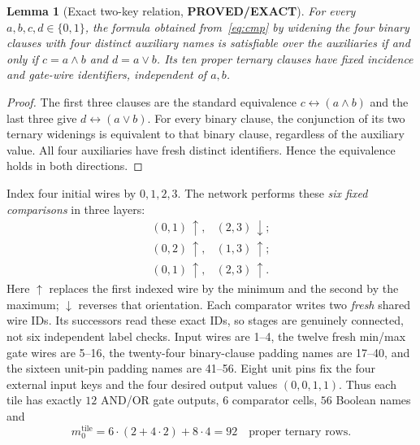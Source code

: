 \documentclass[11pt]{article}
\newtheorem{lemma}[theorem]{Lemma}
\begin{document}
\begin{lemma}[Exact two-key relation, \textbf{PROVED/EXACT}]
For every $a,b,c,d\in\{0,1\}$, the formula obtained from~\eqref{eq:cmp} by widening the four binary clauses with four distinct auxiliary names is satisfiable over the auxiliaries if and only if $c=a\wedge b$ and $d=a\vee b$. Its ten proper ternary clauses have fixed incidence and gate-wire identifiers, independent of $a,b$.
\end{lemma}
\begin{proof}
The first three clauses are the standard equivalence $c\leftrightarrow(a\wedge b)$ and the last three give $d\leftrightarrow(a\vee b)$. For every binary clause, the conjunction of its two ternary widenings is equivalent to that binary clause, regardless of the auxiliary value. All four auxiliaries have fresh distinct identifiers. Hence the equivalence holds in both directions.
\end{proof}

Index four initial wires by $0,1,2,3$. The network performs these \emph{six fixed comparisons} in three layers:
\[
\begin{array}{lll}
(0,1)\,\uparrow,&(2,3)\,\downarrow;\\
(0,2)\,\uparrow,&(1,3)\,\uparrow;\\
(0,1)\,\uparrow,&(2,3)\,\uparrow.
\end{array}
\]
Here $\uparrow$ replaces the first indexed wire by the minimum and the second by the maximum; $\downarrow$ reverses that orientation. Each comparator writes two \emph{fresh} shared wire IDs. Its successors read these exact IDs, so stages are genuinely connected, not six independent label checks. Input wires are 1--4, the twelve fresh min/max gate wires are 5--16, the twenty-four binary-clause padding names are 17--40, and the sixteen unit-pin padding names are 41--56. Eight unit pins fix the four external input keys and the four desired output values $(0,0,1,1)$. Thus each tile has exactly $12$ AND/OR gate outputs, $6$ comparator cells, $56$ Boolean names and
\[
\boxed{m_0^{\mathrm{tile}}=6\cdot(2+4\cdot2)+8\cdot4=92}\quad\text{proper ternary rows}.
\]
\end{document}
